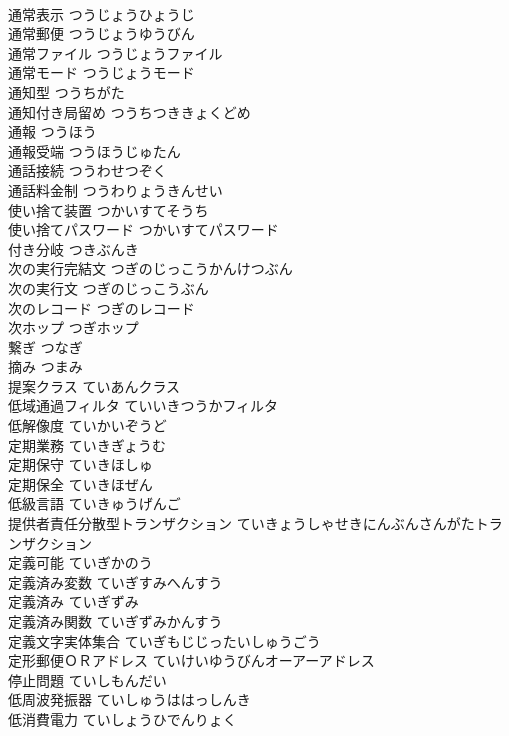 \documentclass[8pt]{extreport}
\begin{document}
\begin{CJK}{UTF8}{min}
\\	通常表示	つうじょうひょうじ	
\\	通常郵便	つうじょうゆうびん	
\\	通常ファイル	つうじょうファイル	
\\	通常モード	つうじょうモード	
\\	通知型	つうちがた	
\\	通知付き局留め	つうちつききょくどめ	
\\	通報	つうほう	
\\	通報受端	つうほうじゅたん	
\\	通話接続	つうわせつぞく	
\\	通話料金制	つうわりょうきんせい	
\\	使い捨て装置	つかいすてそうち	
\\	使い捨てパスワード	つかいすてパスワード	
\\	付き分岐	つきぶんき	
\\	次の実行完結文	つぎのじっこうかんけつぶん	
\\	次の実行文	つぎのじっこうぶん	
\\	次のレコード	つぎのレコード	
\\	次ホップ	つぎホップ	
\\	繋ぎ	つなぎ	
\\	摘み	つまみ	
\\	提案クラス	ていあんクラス	
\\	低域通過フィルタ	ていいきつうかフィルタ	
\\	低解像度	ていかいぞうど	
\\	定期業務	ていきぎょうむ	
\\	定期保守	ていきほしゅ	
\\	定期保全	ていきほぜん	
\\	低級言語	ていきゅうげんご	
\\	提供者責任分散型トランザクション	ていきょうしゃせきにんぶんさんがたトランザクション	
\\	定義可能	ていぎかのう	
\\	定義済み変数	ていぎすみへんすう	
\\	定義済み	ていぎずみ	
\\	定義済み関数	ていぎずみかんすう	
\\	定義文字実体集合	ていぎもじじったいしゅうごう	
\\	定形郵便ＯＲアドレス	ていけいゆうびんオーアーアドレス	
\\	停止問題	ていしもんだい	
\\	低周波発振器	ていしゅうははっしんき	
\\	低消費電力	ていしょうひでんりょく	

\end{CJK}
\end{document}
